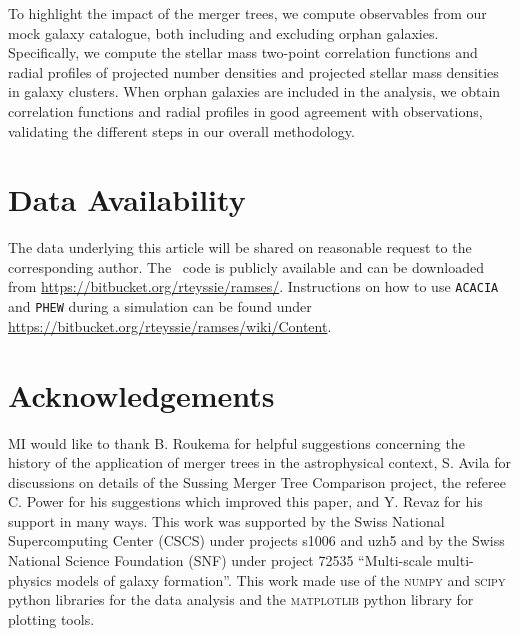 To highlight  the impact of  the merger trees, we  compute observables
from our  mock galaxy catalogue,  both including and  excluding orphan
galaxies.  Specifically,   we  compute  the  stellar   mass  two-point
correlation  functions   and  radial  profiles  of   projected  number
densities and projected stellar mass densities in galaxy clusters. When orphan
galaxies are included in the analysis, we obtain correlation functions
and radial  profiles in  good agreement with  observations, validating
the different steps in our overall methodology.



\section*{Data Availability}

The data underlying this article will be shared on reasonable request
to the corresponding author. The \ramses\  code is  publicly available
and  can be  downloaded from \url{https://bitbucket.org/rteyssie/ramses/}.
Instructions  on how to use \texttt{ACACIA} and \texttt{PHEW} during a
simulation can be found under
\url{https://bitbucket.org/rteyssie/ramses/wiki/Content}.


\section*{Acknowledgements}

MI would like  to thank B. Roukema for  helpful suggestions concerning
the history  of the application  of merger trees in  the astrophysical
context, S.   Avila for discussions  on details of the  Sussing Merger
Tree Comparison  project, the referee C. Power for his suggestions
which improved this paper, and Y. Revaz for  his support in many  ways.
This  work  was supported  by the  Swiss
National Supercomputing  Center (CSCS)  under projects s1006  and uzh5
and  by the  Swiss  National Science  Foundation  (SNF) under  project
72535 ``Multi-scale multi-physics models of galaxy formation''.  This
work        made        use        of        the        \textsc{numpy}
\citep{harrisArrayProgrammingNumPy2020}       and       \textsc{scipy}
\citep{virtanenSciPyFundamentalAlgorithms2020}  python  libraries  for
the      data      analysis      and      the      \textsc{matplotlib}
\citep{hunterMatplotlib2DGraphics2007}  python  library  for  plotting
tools.

